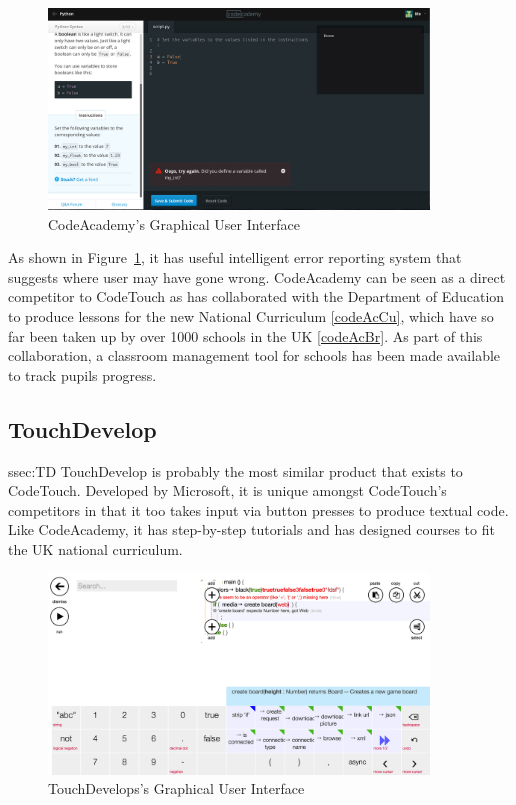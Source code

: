 \documentclass[ %
                    author={Jonathan Rankin},
                supervisor={Dr. David May, Dr. Ian Holyer},
                    degree={MEng},
                     title={CodeTouch},
                  subtitle={A Revolutionary Way To Program Real Code On Touch Screen Devices},
                      type={enterprise},
                      year={2015 } ]{dissertation}
\begin{document}
\begin{figure}[h]
\centering
\includegraphics[width=0.9\textwidth]{CodeAcademy}
\caption{CodeAcademy's Graphical User Interface}
\label{fig:codeac}
\end{figure}

As shown in Figure~\ref{fig:codeac}, it has useful intelligent error reporting system that suggests where user may have gone wrong. CodeAcademy can be seen as a direct competitor to CodeTouch as has collaborated with the Department of Education to produce lessons for the new National Curriculum \ref{codeAcCu}, which have so far been taken up by over 1000 schools in the UK \ref{codeAcBr}. As part of this collaboration, a classroom management tool for schools has been made available to track pupils progress.




\subsection{TouchDevelop}{ssec:TD}
TouchDevelop is probably the most similar product that exists to CodeTouch. Developed by Microsoft, it is unique amongst CodeTouch's competitors in that it too takes input via button presses to produce textual code. Like CodeAcademy, it has step-by-step tutorials and has designed courses to fit the UK national curriculum. 

\begin{figure}[h]
\centering
\includegraphics[width=0.9\textwidth]{touchdevelop}
\caption{TouchDevelops's Graphical User Interface}
\label{fig:touch}
\end{figure}
\end{document}
